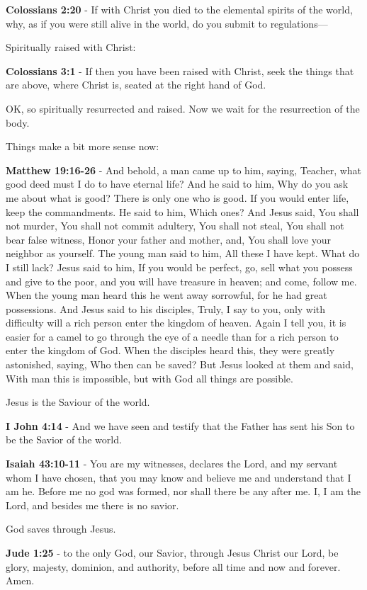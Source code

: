 \documentclass[11pt]{article}
\begin{document}
\textbf{Colossians 2:20} - If with Christ you died to the elemental spirits of the world, why, as if you were still alive in the world, do you submit to regulations—

Spiritually raised with Christ:

\textbf{Colossians 3:1} - If then you have been raised with Christ, seek the things that are above, where Christ is, seated at the right hand of God.

OK, so spiritually resurrected and raised. Now we wait for the resurrection of the body.

Things make a bit more sense now:

\textbf{Matthew 19:16-26} - And behold, a man came up to him, saying, Teacher, what good deed must I do to have eternal life? And he said to him, Why do you ask me about what is good? There is only one who is good. If you would enter life, keep the commandments. He said to him, Which ones? And Jesus said, You shall not murder, You shall not commit adultery, You shall not steal, You shall not bear false witness, Honor your father and mother, and, You shall love your neighbor as yourself. The young man said to him, All these I have kept. What do I still lack? Jesus said to him, If you would be perfect, go, sell what you possess and give to the poor, and you will have treasure in heaven; and come, follow me. When the young man heard this he went away sorrowful, for he had great possessions. And Jesus said to his disciples, Truly, I say to you, only with difficulty will a rich person enter the kingdom of heaven. Again I tell you, it is easier for a camel to go through the eye of a needle than for a rich person to enter the kingdom of God. When the disciples heard this, they were greatly astonished, saying, Who then can be saved? But Jesus looked at them and said, With man this is impossible, but with God all things are possible.

Jesus is the Saviour of the world.

\textbf{I John 4:14} - And we have seen and testify that the Father has sent his Son to be the Savior of the world.

\textbf{Isaiah 43:10-11} - You are my witnesses, declares the Lord, and my servant whom I have chosen, that you may know and believe me and understand that I am he. Before me no god was formed, nor shall there be any after me. I, I am the Lord, and besides me there is no savior.

God saves through Jesus. 

\textbf{Jude 1:25} - to the only God, our Savior, through Jesus Christ our Lord, be glory, majesty, dominion, and authority, before all time and now and forever. Amen.
\end{document}
